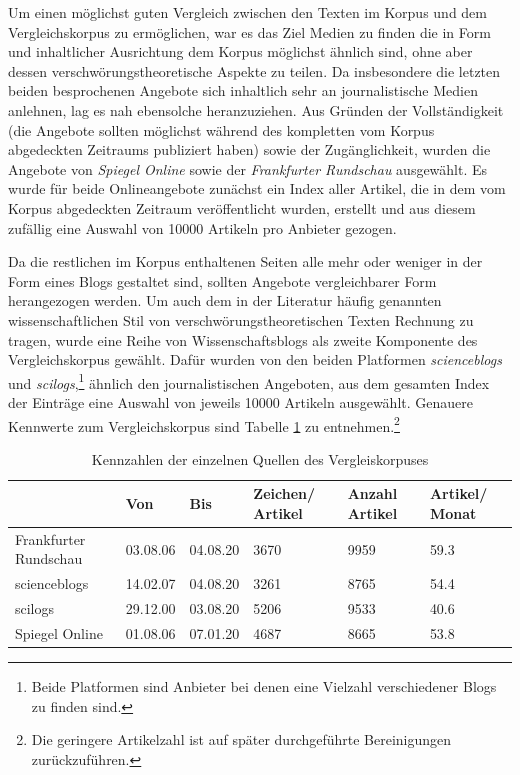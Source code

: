\bigskip

Um einen möglichst guten Vergleich zwischen den Texten im Korpus und dem Vergleichskorpus zu ermöglichen, war es das Ziel Medien zu finden die in Form und inhaltlicher Ausrichtung dem Korpus möglichst ähnlich sind, ohne aber dessen verschwörungstheoretische Aspekte zu teilen.
Da insbesondere die letzten beiden besprochenen Angebote sich inhaltlich sehr an journalistische  Medien anlehnen, lag es nah ebensolche heranzuziehen.
Aus Gründen der Vollständigkeit (die Angebote sollten möglichst während des kompletten vom Korpus abgedeckten Zeitraums publiziert haben) sowie der Zugänglichkeit, wurden die Angebote von \textit{Spiegel Online} sowie der \textit{Frankfurter Rundschau} ausgewählt.
Es wurde für beide Onlineangebote zunächst ein Index aller Artikel, die in dem vom Korpus abgedeckten Zeitraum veröffentlicht wurden, erstellt und aus diesem zufällig eine Auswahl von 10000 Artikeln pro Anbieter gezogen.

Da die restlichen im Korpus enthaltenen Seiten alle mehr oder weniger in der Form eines Blogs gestaltet sind, sollten Angebote vergleichbarer Form herangezogen werden.
Um auch dem in der Literatur häufig genannten wissenschaftlichen Stil von verschwörungstheoretischen Texten Rechnung zu tragen, wurde eine Reihe von Wissenschaftsblogs als zweite Komponente des Vergleichskorpus gewählt.
Dafür wurden von den beiden Platformen \textit{scienceblogs} und \textit{scilogs},\footnote{Beide Platformen sind Anbieter bei denen eine Vielzahl verschiedener Blogs zu finden sind.} ähnlich den journalistischen Angeboten, aus dem gesamten Index der Einträge eine Auswahl von jeweils 10000 Artikeln ausgewählt.
Genauere Kennwerte zum Vergleichskorpus sind Tabelle \ref{comcorpus-stats} zu entnehmen.\footnote{Die geringere Artikelzahl ist auf später durchgeführte Bereinigungen zurückzuführen.}

\begin{table}
    \begin{center}
        \begin{tabularx}{\textwidth}{l|XXXXX}
            \toprule
            & Von & Bis & Zeichen/ Artikel & Anzahl Artikel & Artikel/ Monat\\
            \midrule
            Frankfurter Rundschau & 03.08.06 & 04.08.20 & 3670 & 9959 & 59.3\\
            scienceblogs & 14.02.07 & 04.08.20 & 3261 & 8765 & 54.4\\
            scilogs & 29.12.00 & 03.08.20 & 5206 & 9533 & 40.6\\
            Spiegel Online & 01.08.06 & 07.01.20 & 4687 & 8665 & 53.8\\
            \bottomrule
        \end{tabularx}
        \caption{Kennzahlen der einzelnen Quellen des Vergleiskorpuses}
        \label{comcorpus-stats}
    \end{center}
\end{table}

